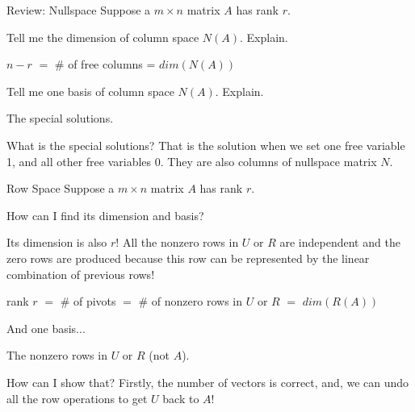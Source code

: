 \documentclass{beamer}
\begin{document}
\begin{frame}{Review: Nullspace}
Suppose a $m \times n$ matrix $A$ has rank $r$.

\vspace{3pt}
Tell me the dimension of column space $N(A)$. Explain.

\begin{center}
    $n-r$ $=$ \# of free columns = $dim(N(A))$
\end{center}

Tell me one basis of column space $N(A)$. Explain.

\begin{center}
    The special solutions.
\end{center}

What is the special solutions? That is the solution when we set one free variable 1, and all other free variables 0. They are also columns of nullspace matrix $N$.
\end{frame}

\begin{frame}{Row Space}
Suppose a $m \times n$ matrix $A$ has rank $r$.

\vspace{3pt}
How can I find its dimension and basis?

\vspace{3pt}
Its dimension is also $r$! All the nonzero rows in $U$ or $R$ are independent and the zero rows are produced because this row can be represented by the linear combination of previous rows!

\begin{center}
    rank $r$ $=$ \# of pivots $=$ \# of nonzero rows in $U$ or $R$ $=$ $dim(R(A))$
\end{center}

And one basis...

\begin{center}
    The nonzero rows in $U$ or $R$ (not $A$).
\end{center}

How can I show that? Firstly, the number of vectors is correct, and, we can undo all the row operations to get $U$ back to $A$!

\end{frame}
\end{document}
